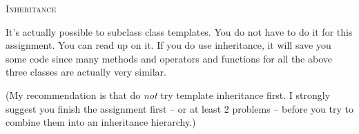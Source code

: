 \textsc{Inheritance}

It's actually possible to subclass class templates.
You do not have to do it for this assignment.
You can read up on it.
If you do use inheritance, it will save you some code
since many methods and operators and functions
for all the above three classes are actually very similar.

(My recommendation is that do \textit{not}
  try template inheritance first.
I strongly suggest you finish the assignment
first -- or at least 2 problems -- before you
try to combine them into an inheritance hierarchy.)
